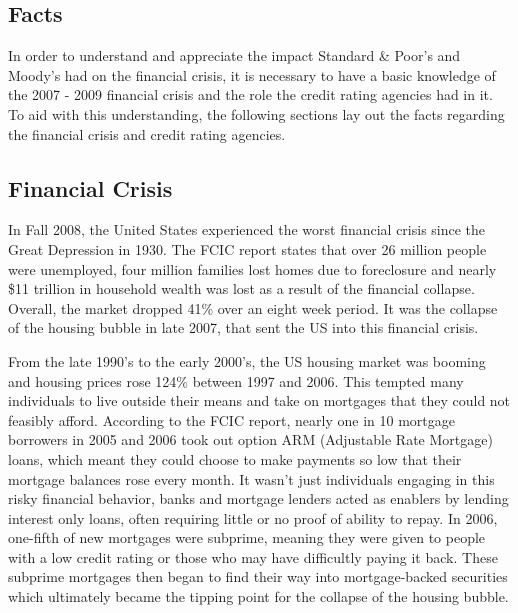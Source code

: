 \documentclass[11pt]{article}
\begin{document}
\newpage


\begin{multicols}{2}
\setcounter{page}{1}
\section{Facts}

In order to understand and appreciate the impact Standard \& Poor's and Moody's had on the financial crisis, it is necessary to have a basic knowledge of the 2007 - 2009 financial crisis and the role the credit rating agencies had in it.  To aid with this understanding, the following sections lay out the facts regarding the financial crisis and credit rating agencies.


\subsection{Financial Crisis}
In Fall 2008, the United States experienced the worst financial crisis since the Great Depression in 1930.  The FCIC report states that over 26 million people were unemployed, four million families lost homes due to foreclosure and nearly \$11 trillion in household wealth was lost as a result of the financial collapse.\cite[p.~xv]{govtReport}  Overall, the market dropped 41\% over an eight week period.\cite{marketWatch}  It was the collapse of the housing bubble in late 2007, that sent the US into this financial crisis.\cite[p.~xxv]{govtReport} 


From the late 1990's to the early 2000's, the US housing market was booming and housing prices rose 124\% between 1997 and 2006. \cite{economistCreditCrunch}  This tempted many individuals to live outside their means and take on mortgages that they could not feasibly afford.  According to the FCIC report, nearly one in 10 mortgage borrowers in 2005 and 2006 took out option ARM (Adjustable Rate Mortgage) loans, which meant they could choose to make payments so low that their mortgage balances rose every month. \cite[p.~xx]{govtReport} It wasn't just individuals engaging in this risky financial behavior, banks and mortgage lenders acted as enablers by lending interest only loans, often requiring little or no proof of ability to repay. \cite[p.~xxiii]{govtReport}  In 2006, one-fifth of new mortgages were subprime, meaning they were given to people with a low credit rating or those who may have difficultly paying it back. \cite{economistCreditCrunch}  These subprime mortgages then began to find their way into mortgage-backed securities which ultimately became the tipping point for the collapse of the housing bubble. \cite[p.xxv]{govtReport}
\newline


\end{multicols}
\end{document}
